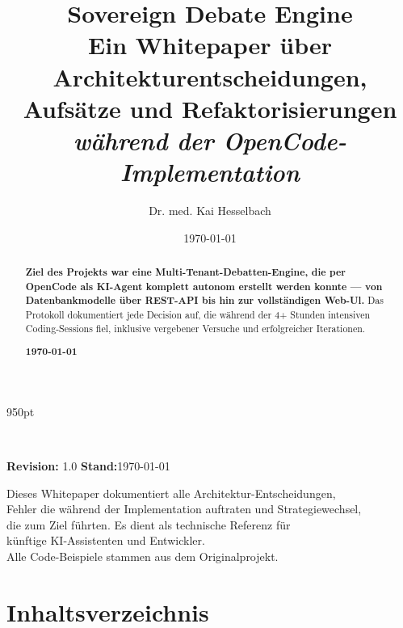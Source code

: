\documentclass[12pt,a4paper,titlepage,abstract]{scrreprt}
\title{\textbf{Sovereign Debate Engine}\\[4mm]
  \large Ein Whitepaper über Architekturentscheidungen,\\Aufsätze und Refaktorisierungen\\\textit{während der OpenCode-Implementation}}
\author{Dr. med. Kai Hesselbach}
\date{\today}
\begin{document}
\maketitle{}
\thispagestyle{empty}

\vfill 950pt

~ \vspace{2cm}

\noindent\textbf{Revision:} 1.0 \hfill\textbf{Stand:}\today

\vspace{2cm}

\begin{center}
  \begin{minipage}{8cm}
    \small
    Dieses Whitepaper dokumentiert alle Architektur-Entscheidungen,\\
    Fehler die während der Implementation auftraten und Strategiewechsel,\\
    die zum Ziel führten. Es dient als technische Referenz für\\
    künftige KI-Assistenten und Entwickler.\\[1cm]
    Alle Code-Beispiele stammen aus dem Originalprojekt.\\
    \vspace{2cm}
  \end{minipage}
\end{center}

\begin{abstract}\raggedright\linespread{1.5}\selectfont
\textbf{Ziel des Projekts war eine Multi-Tenant-Debatten-Engine, die per OpenCode als KI-Agent komplett autonom erstellt werden konnte — von Datenbankmodelle über REST-API bis hin zur vollständigen Web-Ul.} Das Protokoll dokumentiert jede Decision auf, die während der 4+ Stunden intensiven Coding-Sessions fiel, inklusive vergebener Versuche und erfolgreicher Iterationen.

\vspace{1cm}
\begin{flushright}\Large\textbf{\today}\end{flushright}
\end{abstract}


\mainmatter   %

\chapter*{Inhaltsverzeichnis}%
\end{document}
